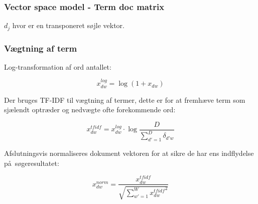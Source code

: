 \documentclass[xcolor=table]{beamer}
\begin{document}
\begin{frame}

  \frametitle{Vector space model - Term doc matrix}


  \begin{center}
  \end{center}

  $d_j$ hvor er en transponeret s\o jle vektor.

\end{frame}

\begin{frame}

  \frametitle{V\ae gtning af term}

  Log-transformation af ord antallet:

  \[
  x_{dw}^{log} = \log{(1 + x_{dw})}
  \]

  Der bruges TF-IDF til v\ae gtning af termer, dette er for at fremh\ae ve term som sj\ae lendt optr\ae der og nedv\ae gte ofte forekommende ord:

  \[
  x_{dw}^{tfidf} = x_{dw}^{log} \cdot \log{\frac{D}{\sum_{d\prime = 1}^{D}\delta_{d\prime w}}}
  \]

  Afslutningsvis normaliseres dokument vektoren for at sikre de har ens indflydelse p\aa\ s\o geresultatet:

  \[
  x_{dw}^{norm} = \frac{x_{dw}^{tfidf}}{\sqrt{\sum_{w\prime = 1}^{W} {x_{dw}^{tfidf}}^{2}}}
  \]

\end{frame}
\end{document}
